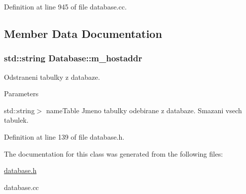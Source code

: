 Definition at line 945 of file database.cc.



\subsection{Member Data Documentation}
\hypertarget{classDatabase_a73a3ea4197118649af11db64a0905f26}{
\subsubsection[{m\_\-hostaddr}]{\setlength{\rightskip}{0pt plus 5cm}std::string {\bf Database::m\_\-hostaddr}}}
\label{classDatabase_a73a3ea4197118649af11db64a0905f26}
Odstraneni tabulky z databaze. 
\begin{DoxyParams}{Parameters}
\item[\mbox{\tt[in]} {\em $<$const}]std::string$>$ nameTable Jmeno tabulky odebirane z databaze. Smazani vsech tabulek. \end{DoxyParams}


Definition at line 139 of file database.h.



The documentation for this class was generated from the following files:\begin{DoxyCompactItemize}
\item 
\hyperlink{database_8h}{database.h}\item 
database.cc\end{DoxyCompactItemize}

